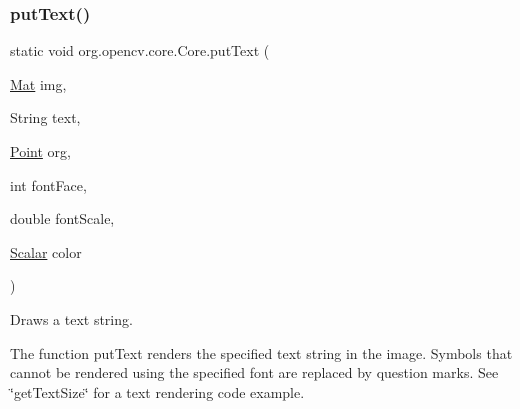 \subsubsection{\texorpdfstring{put\+Text()}{putText()}\hspace{0.1cm}{\footnotesize\ttfamily [3/3]}}
{\footnotesize\ttfamily static void org.\+opencv.\+core.\+Core.\+put\+Text (\begin{DoxyParamCaption}\item[{\mbox{\hyperlink{classorg_1_1opencv_1_1core_1_1_mat}{Mat}}}]{img,  }\item[{String}]{text,  }\item[{\mbox{\hyperlink{classorg_1_1opencv_1_1core_1_1_point}{Point}}}]{org,  }\item[{int}]{font\+Face,  }\item[{double}]{font\+Scale,  }\item[{\mbox{\hyperlink{classorg_1_1opencv_1_1core_1_1_scalar}{Scalar}}}]{color }\end{DoxyParamCaption})\hspace{0.3cm}{\ttfamily [static]}}

Draws a text string.

The function {\ttfamily put\+Text} renders the specified text string in the image. Symbols that cannot be rendered using the specified font are replaced by question marks. See \char`\"{}get\+Text\+Size\char`\"{} for a text rendering code example.


